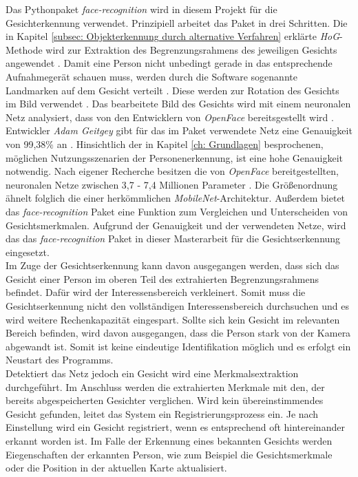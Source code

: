 	Das Pythonpaket \textit{face-recognition} wird in diesem Projekt für die Gesichterkennung verwendet. Prinzipiell arbeitet das Paket in drei Schritten. Die in Kapitel \ref{subsec: Objekterkennung durch alternative Verfahren} erklärte \textit{HoG}-Methode wird zur Extraktion des Begrenzungsrahmens des jeweiligen Gesichts angewendet \cite{facerecarticle}. Damit eine Person nicht unbedingt gerade in das entsprechende Aufnahmegerät schauen muss, werden durch die Software sogenannte Landmarken auf dem Gesicht verteilt \cite{facerecarticle}. Diese werden zur Rotation des Gesichts im Bild verwendet \cite{facerecarticle}. Das bearbeitete Bild des Gesichts wird mit einem neuronalen Netz analysiert, dass von den Entwicklern von \textit{OpenFace} bereitsgestellt wird \cite{facerecarticle}. Entwickler \textit{Adam Geitgey} gibt für das im Paket verwendete Netz eine Genauigkeit von 99,38$\percent$ an \cite{facerecognition}. Hinsichtlich der in Kapitel \ref{ch: Grundlagen} besprochenen, möglichen Nutzungsszenarien der Personenerkennung, ist eine hohe Genauigkeit notwendig. Nach eigener Recherche besitzen die von \textit{OpenFace} bereitgestellten, neuronalen Netze zwischen 3,7 - 7,4 Millionen Parameter \cite{openface}. Die Größenordnung ähnelt folglich die einer herkömmlichen \textit{MobileNet}-Architektur. Außerdem bietet das \textit{face-recognition} Paket eine Funktion zum Vergleichen und Unterscheiden von Gesichtsmerkmalen. Aufgrund der Genauigkeit und der verwendeten Netze, wird das das \textit{face-recognition} Paket in dieser Masterarbeit für die Gesichtserkennung eingesetzt.\\
	
	Im Zuge der Gesichtserkennung kann davon ausgegangen werden, dass sich das Gesicht einer Person im oberen Teil des extrahierten Begrenzungsrahmens befindet. Dafür wird der Interessensbereich verkleinert. Somit muss die Gesichtserkennung nicht den vollständigen Interessensbereich durchsuchen und es wird weitere Rechenkapazität eingespart. Sollte sich kein Gesicht im relevanten Bereich befinden, wird davon ausgegangen, dass die Person stark von der Kamera abgewandt ist. Somit ist keine eindeutige Identifikation möglich und es erfolgt ein Neustart des Programms.\\
	
	Detektiert das Netz jedoch ein Gesicht wird eine Merkmalsextraktion durchgeführt. Im Anschluss werden die extrahierten Merkmale mit den, der bereits abgespeicherten Gesichter verglichen. Wird kein übereinstimmendes Gesicht gefunden, leitet das System ein Registrierungsprozess ein. Je nach Einstellung wird ein Gesicht registriert, wenn es entsprechend oft hintereinander erkannt worden ist. Im Falle der Erkennung eines bekannten Gesichts werden Eiegenschaften der erkannten Person, wie zum Beispiel die Gesichtsmerkmale oder die Position in der aktuellen Karte aktualisiert. \\ 
	
	  

	

		
	
		
		
				   		

